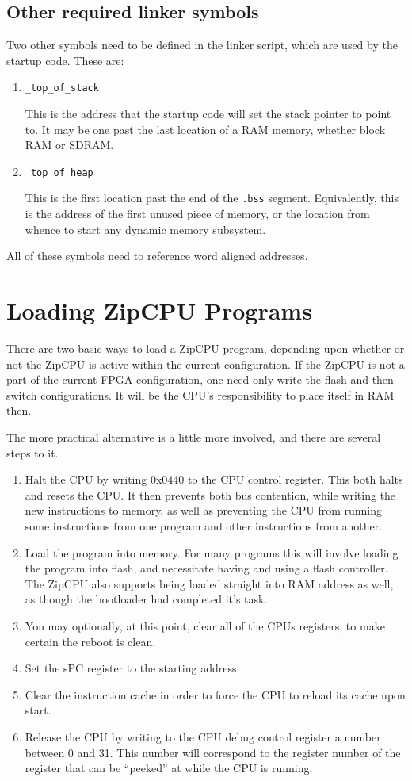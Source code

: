 \documentclass{gqtekspec}
\begin{document}
\subsection{Other required linker symbols}\label{sec:ld-other}

Two other symbols need to be defined in the linker script, which are used
by the startup code.  These are:
\begin{enumerate}
\item {\tt \_top\_of\_stack}

	This is the address that the startup code will set the stack pointer
	to point to.  It may be one past the last location of a RAM memory,
	whether block RAM or SDRAM.

\item {\tt \_top\_of\_heap}

	This is the first location past the end of the {\tt .bss} segment.
	Equivalently, this is the address of the first unused piece of
	memory, or the location from whence to start any dynamic memory
	subsystem.
\end{enumerate}

All of these symbols need to reference word aligned addresses.

\section{Loading ZipCPU Programs}
There are two basic ways to load a ZipCPU program, depending upon whether or
not the ZipCPU is active within the current configuration.  If the ZipCPU
is not a part of the current FPGA configuration, one need only write the 
flash and then switch configurations.  It will be the CPU's responsibility
to place itself in RAM then. 

The more practical alternative is a little more involved, and there are
several steps to it.
\begin{enumerate}
\item Halt the CPU by writing 0x0440 to the CPU control register.  This
	both halts and resets the CPU.  It then prevents both bus contention,
	while writing the new instructions to memory, as well as preventing the
	CPU from running some instructions from one program and other
	instructions from another.
\item Load the program into memory.  For many programs this will involve
	loading the program into flash, and necessitate having and using a 
	flash controller.  The ZipCPU also supports being loaded straight into
	RAM address as well, as though the bootloader had completed
	it's task.
\item You may optionally, at this point, clear all of the CPUs registers,
	to make certain the reboot is clean.
\item Set the sPC register to the starting address. 
\item Clear the instruction cache in order to force the CPU to reload its
	cache upon start.
\item Release the CPU by writing to the CPU debug control register a number
	between 0 and 31.  This number will correspond to the register number
	of the register that can be ``peeked'' at while the CPU is running.
\end{enumerate}
\end{document}
